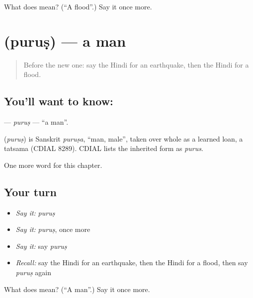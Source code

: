 \begin{tcolorbox}[breakable,colback=teal!4,colframe=teal!35!black,title={Before you move on}]
What does  mean? (\textquotedblleft{}A flood\textquotedblright{}.) Say it once more.
\end{tcolorbox}
\section[\texorpdfstring{\hi{पुरुष} (puruṣ)}{पुरुष (puruṣ)}]{ (puruṣ) — a man}

\label{lesson:HI-C253-purus}



\begin{quote}
Before the new one: say the Hindi for an earthquake, then the Hindi for a flood.
\end{quote}

\subsection*{You'll want to know: }
\textbf{} — \emph{puruṣ} — \textquotedblleft{}a man\textquotedblright{}.

\begin{cousinweb}
\textbf{} (\emph{puruṣ}) is Sanskrit \emph{puruṣa}, \textquotedblleft{}man, male\textquotedblright{}, taken over whole as a learned loan, a tatsama (CDIAL 8289). CDIAL lists the inherited form as \emph{purus}.
\end{cousinweb}

\begin{grammarlens}[title={What you've built}]
One more word for this chapter.
\end{grammarlens}

\subsection*{Your turn}
\begin{itemize}
\raggedright
  \item \emph{Say it:} \emph{puruṣ}
  \item \emph{Say it:} \emph{puruṣ}, once more
  \item \emph{Say it:} say \emph{puruṣ}
  \item \emph{Recall:} say the Hindi for an earthquake, then the Hindi for a flood, then say \emph{puruṣ} again
\end{itemize}

\begin{tcolorbox}[breakable,colback=teal!4,colframe=teal!35!black,title={Before you move on}]
What does  mean? (\textquotedblleft{}A man\textquotedblright{}.) Say it once more.
\end{tcolorbox}
